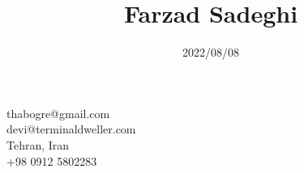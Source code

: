 \documentclass[8pt]{article}
\title{\bfseries Farzad Sadeghi}
\date{2022/08/08}
\begin{document}
\begin{multicols}{2}
  \maketitle
  \begin{center}
    \begin{minipage}[ht]{0.2\textwidth}{\centering}
      \vspace*{\fill}
      \centering
      thabogre@gmail.com\\
      devi@terminaldweller.com\\
      Tehran, Iran\\
      +98 0912 5802283
      \centering
      \vspace*{\fill}
    \end{minipage}
  \end{center}


\end{multicols}
\end{document}
